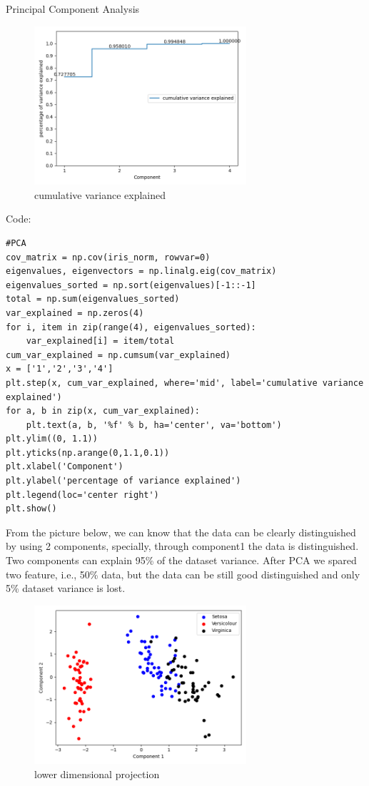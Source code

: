 \documentclass[
	ngerman,
	]{tudaexercise}
\begin{document}
\begin{task}{Principal Component Analysis}
\begin{subtask}
\begin{figure}[H] 
\centering 
\includegraphics[width=0.7\textwidth]{pic1} 
\caption{cumulative variance explained} 
\label{Fig.main2} 
\end{figure}

Code:
\begin{lstlisting}
#PCA
cov_matrix = np.cov(iris_norm, rowvar=0)
eigenvalues, eigenvectors = np.linalg.eig(cov_matrix)
eigenvalues_sorted = np.sort(eigenvalues)[-1::-1]
total = np.sum(eigenvalues_sorted)
var_explained = np.zeros(4)
for i, item in zip(range(4), eigenvalues_sorted):
    var_explained[i] = item/total
cum_var_explained = np.cumsum(var_explained)
x = ['1','2','3','4']
plt.step(x, cum_var_explained, where='mid', label='cumulative variance explained')
for a, b in zip(x, cum_var_explained):
    plt.text(a, b, '%f' % b, ha='center', va='bottom')
plt.ylim((0, 1.1))
plt.yticks(np.arange(0,1.1,0.1))
plt.xlabel('Component')
plt.ylabel('percentage of variance explained')
plt.legend(loc='center right')
plt.show()
\end{lstlisting}

\end{subtask}

\begin{subtask}
From the picture below, we can know that the data can be clearly distinguished by using 2 components, specially, through component1 the data is distinguished. Two components can explain 95\% of the dataset variance. After PCA we spared two feature, i.e., 50\% data, but the data can be still good distinguished and only 5\% dataset variance is lost.
\begin{figure}[H] 
\centering 
\includegraphics[width=0.7\textwidth]{pic2} 
\caption{ lower dimensional projection} 
\label{Fig.main2} 
\end{figure}


\end{subtask}
\end{task}
\end{document}
